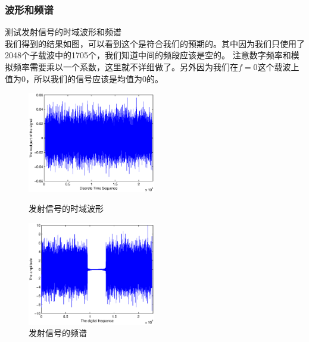 \documentclass{article}
\begin{document}
\subsubsection{波形和频谱}
测试发射信号的时域波形和频谱\\
我们得到的结果如图，可以看到这个是符合我们的预期的。其中因为我们只使用了2048个子载波中的1705个，我们知道中间的频段应该是空的。
注意数字频率和模拟频率需要乘以一个系数，这里就不详细做了。另外因为我们在\(f=0\)这个载波上值为0，所以我们的信号应该是均值为0的。
\begin{figure}[h]
\begin{minipage}[t]{0.5\linewidth}
\centering
\includegraphics[width=2.2in]{2.eps}
\caption{发射信号的时域波形}
\label{fig:side:a}
\end{minipage}%
\begin{minipage}[t]{0.5\linewidth}
\centering
\includegraphics[width=2.2in]{3.eps}
\caption{发射信号的频谱}
\label{fig:side:b}
\end{minipage}
\end{figure}
\end{document}

